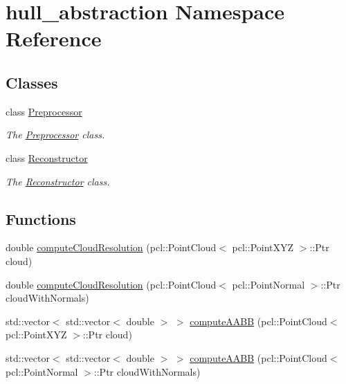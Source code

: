 \hypertarget{namespacehull__abstraction}{}\section{hull\+\_\+abstraction Namespace Reference}
\label{namespacehull__abstraction}
\subsection*{Classes}
\begin{DoxyCompactItemize}
\item 
class \hyperlink{classhull__abstraction_1_1_preprocessor}{Preprocessor}
\begin{DoxyCompactList}\small\item\em The \hyperlink{classhull__abstraction_1_1_preprocessor}{Preprocessor} class. \end{DoxyCompactList}\item 
class \hyperlink{classhull__abstraction_1_1_reconstructor}{Reconstructor}
\begin{DoxyCompactList}\small\item\em The \hyperlink{classhull__abstraction_1_1_reconstructor}{Reconstructor} class. \end{DoxyCompactList}\end{DoxyCompactItemize}
\subsection*{Functions}
\begin{DoxyCompactItemize}
\item 
double \hyperlink{namespacehull__abstraction_aee513dfed72060d83ec57c5909c9640e}{compute\+Cloud\+Resolution} (pcl\+::\+Point\+Cloud$<$ pcl\+::\+Point\+X\+YZ $>$\+::Ptr cloud)
\item 
double \hyperlink{namespacehull__abstraction_aa0e1e236f8dd95c43e92d142cfc2754e}{compute\+Cloud\+Resolution} (pcl\+::\+Point\+Cloud$<$ pcl\+::\+Point\+Normal $>$\+::Ptr cloud\+With\+Normals)
\item 
std\+::vector$<$ std\+::vector$<$ double $>$ $>$ \hyperlink{namespacehull__abstraction_a2e467ab4a24489895dc694bf4dec4ad1}{compute\+A\+A\+BB} (pcl\+::\+Point\+Cloud$<$ pcl\+::\+Point\+X\+YZ $>$\+::Ptr cloud)
\item 
std\+::vector$<$ std\+::vector$<$ double $>$ $>$ \hyperlink{namespacehull__abstraction_ad0b9805fbf18fffc219231131cee1d9b}{compute\+A\+A\+BB} (pcl\+::\+Point\+Cloud$<$ pcl\+::\+Point\+Normal $>$\+::Ptr cloud\+With\+Normals)
\end{DoxyCompactItemize}


